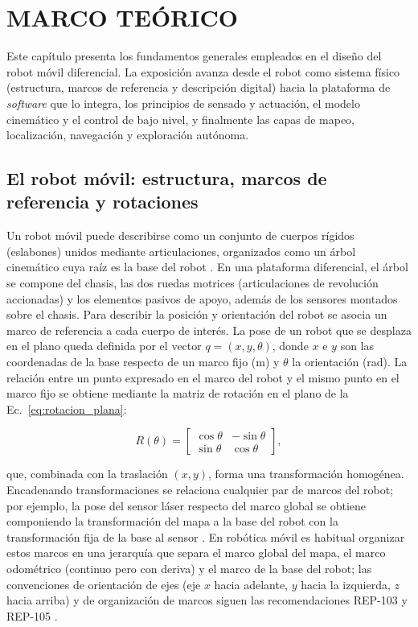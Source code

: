 \chapter{MARCO TEÓRICO}
\label{marco_teorico}

Este capítulo presenta los fundamentos generales empleados en el diseño del
robot móvil diferencial. La exposición avanza desde el robot como sistema
físico (estructura, marcos de referencia y descripción digital) hacia la
plataforma de \textit{software} que lo integra, los principios de sensado y
actuación, el modelo cinemático y el control de bajo nivel, y finalmente
las capas de mapeo, localización, navegación y exploración autónoma.
\section{El robot móvil: estructura, marcos de referencia y rotaciones}
\label{sec:robot_definicion}

Un robot móvil puede describirse como un conjunto de cuerpos rígidos
(eslabones) unidos mediante articulaciones, organizados como un árbol
cinemático cuya raíz es la base del robot \citep{corke2023}. En una
plataforma diferencial, el árbol se compone del chasis, las dos ruedas
motrices (articulaciones de revolución accionadas) y los elementos
pasivos de apoyo, además de los sensores montados sobre el chasis.
Para describir la posición y orientación del robot se asocia un marco de
referencia a cada cuerpo de interés. La pose de un robot que se desplaza en
el plano queda definida por el vector $q=(x,y,\theta)$, donde $x$ e $y$ son
las coordenadas de la base respecto de un marco fijo (m) y $\theta$ la
orientación (rad). La relación entre un punto expresado en el marco del robot
y el mismo punto en el marco fijo se obtiene mediante la matriz de rotación
en el plano de la Ec.~\eqref{eq:rotacion_plana}:

\begin{equation}
R(\theta)
=
\begin{bmatrix}
\cos\theta & -\sin\theta\\
\sin\theta & \cos\theta
\end{bmatrix},
\label{eq:rotacion_plana}
\end{equation}

\noindent que, combinada con la traslación $(x,y)$, forma una transformación
homogénea. Encadenando transformaciones se relaciona cualquier par de marcos
del robot; por ejemplo, la pose del sensor láser respecto del marco global se
obtiene componiendo la transformación del mapa a la base del robot con la
transformación fija de la base al sensor \citep{corke2023}. En robótica móvil
es habitual organizar estos marcos en una jerarquía que separa el marco
global del mapa, el marco odométrico (continuo pero con deriva) y el
marco de la base del robot; las convenciones de orientación de ejes (eje $x$
hacia adelante, $y$ hacia la izquierda, $z$ hacia arriba) y de organización
de marcos siguen las recomendaciones REP-103 y REP-105
\citep{rep103,rep105}.

